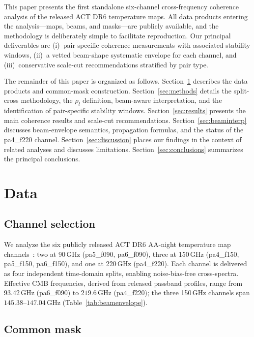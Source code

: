 \documentclass[twocolumn,showpacs,preprintnumbers,amsmath,amssymb,floatfix,prd]{revtex4-2}
\def\ell{l}%
\begin{document}
This paper presents the first standalone six-channel cross-frequency
coherence analysis of the released ACT DR6 temperature maps.  All data
products entering the analysis---maps, beams, and masks---are publicly
available, and the methodology is deliberately simple to facilitate
reproduction.  Our principal deliverables are (i)~pair-specific coherence
measurements with associated stability windows, (ii)~a vetted beam-shape
systematic envelope for each channel, and (iii)~conservative scale-cut
recommendations stratified by pair type.

The remainder of this paper is organized as follows.
Section~\ref{sec:data} describes the data products and common-mask
construction.  Section~\ref{sec:methods} details the split-cross
methodology, the $\rho_\ell$ definition, beam-aware interpretation, and
the identification of pair-specific stability windows.
Section~\ref{sec:results} presents the main coherence results and
scale-cut recommendations.  Section~\ref{sec:beaminterp} discusses
beam-envelope semantics, propagation formulas, and the status of the
pa4\_f220 channel.  Section~\ref{sec:discussion} places our findings in
the context of related analyses and discusses limitations.
Section~\ref{sec:conclusions} summarizes the principal conclusions.

\section{Data}\label{sec:data}

\subsection{Channel selection}\label{sec:channels}

We analyze the six publicly released ACT DR6 AA-night temperature map
channels~\cite{Naess2025}: two at 90\,GHz (pa5\_f090, pa6\_f090), three at
150\,GHz (pa4\_f150, pa5\_f150, pa6\_f150), and one at 220\,GHz
(pa4\_f220).  Each channel is delivered as four independent time-domain
splits, enabling noise-bias-free cross-spectra.  Effective CMB frequencies,
derived from released passband profiles, range from
$93.42\,\mathrm{GHz}$ (pa6\_f090) to $219.6\,\mathrm{GHz}$ (pa4\_f220);
the three 150\,GHz channels span $145.38$--$147.04\,\mathrm{GHz}$
(Table~\ref{tab:beamenvelope}).

\subsection{Common mask}\label{sec:mask}
\end{document}
